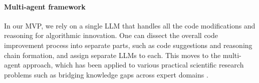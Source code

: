 \documentclass[12pt, legalpaper]{article}
\begin{document}
\paragraph{Multi-agent framework}

In our MVP, we rely on a single LLM that handles all the code modifications and reasoning for algorithmic innovation. 
One can dissect the overall code improvement process into separate parts, such as code suggestions and reasoning chain formation, and assign separate LLMs to each. 
This moves to the multi-agent approach, which has been applied to various practical scientific research problems such as bridging knowledge gaps across expert domains \citep{aryal2024leveraging}. 




\end{document}
